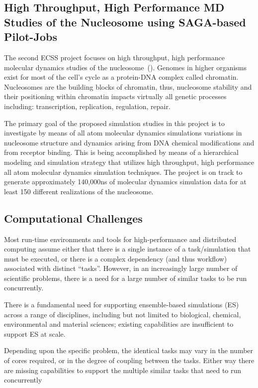 \documentclass{sig-alternate}
\begin{document}
\subsection{High Throughput, High Performance MD Studies of the Nucleosome
using SAGA-based Pilot-Jobs}
The second ECSS project focuses on high throughput, high performance molecular
dynamics studies of the nucleosome~(\cite{TomBishop}). Genomes in higher
organisms
exist for most of the cell's cycle as a protein-DNA complex called chromatin.
Nucleosomes are the building blocks of chromatin, thus, nucleosome stability and
their positioning within chromatin impacts virtually all genetic processes
including: transcription, replication, regulation, repair.

The primary goal of the proposed simulation studies in this project is to
investigate by means of all atom molecular dynamics simulations variations in
nucleosome structure and dynamics arising from DNA chemical modifications and
from receptor binding. This is being accomplished by means of a hierarchical
modeling and simulation strategy that utilizes high throughput, high
performance all atom molecular dynamics simulation techniques. The project is
on track to generate approximately 140,000ns of molecular dynamics simulation
data for at least 150 different realizations of the nucleosome.


\subsection{Computational Challenges}

Most run-time environments and tools for high-performance and
distributed computing assume either that there is a single instance of
a task/simulation that must be executed, or there is a complex
dependency (and thus workflow) associated with distinct ``tasks''.
However, in an increasingly large number of scientific problems, there
is a need for a large number of similar tasks to be run concurrently.

There is a fundamental need for supporting ensemble-based simulations
(ES) across a range of disciplines, including but not limited to
biological, chemical, environmental and material sciences; existing
capabilities are insufficient to support ES at scale. 

Depending upon the specific problem, the identical tasks may vary in
the number of cores required, or in the degree of coupling between the
tasks.  Either way there are missing capabilities to support the
multiple similar tasks that need to run concurrently
\end{document}
